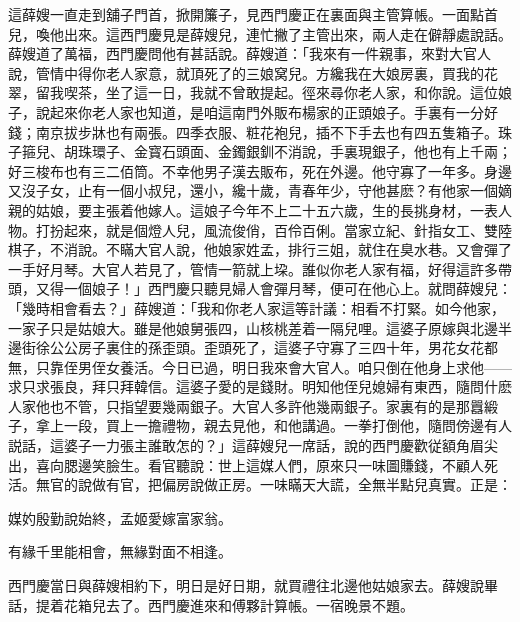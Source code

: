 這薛嫂一直走到舖子門首，掀開簾子，見西門慶正在裏面與主管算帳。一面點首兒，喚他出來。這西門慶見是薛嫂兒，連忙撇了主管出來，兩人走在僻靜處說話。薛嫂道了萬福，西門慶問他有甚話說。薛嫂道：「我來有一件親事，來對大官人說，管情中得你老人家意，就頂死了的三娘窝兒。方纔我在大娘房裏，買我的花翠，留我喫茶，坐了這一日，我就不曾敢提起。徑來尋你老人家，和你說。這位娘子，說起來你老人家也知道，是咱這南門外販布楊家的正頭娘子。手裏有一分好錢；南京拔步牀也有兩張。四季衣服、粧花袍兒，插不下手去也有四五隻箱子。珠子箍兒、胡珠環子、金寳石頭面、金鐲銀釧不消說，手裏現銀子，他也有上千兩；好三梭布也有三二佰筒。不幸他男子漢去販布，死在外邊。他守寡了一年多。身邊又沒子女，止有一個小叔兒，還小，纔十歲，青春年少，守他甚麽？有他家一個嫡親的姑娘，要主張着他嫁人。這娘子今年不上二十五六歲，生的長挑身材，一表人物。打扮起來，就是個燈人兒，風流俊俏，百伶百俐。當家立紀、針指女工、雙陸棋子，不消說。不瞞大官人說，他娘家姓孟，排行三姐，就住在臭水巷。又會彈了一手好月琴。大官人若見了，管情一箭就上垜。誰似你老人家有福，好得這許多帶頭，又得一個娘子！」西門慶只聽見婦人會彈月琴，便可在他心上。就問薛嫂兒：「幾時相會看去？」薛嫂道：「我和你老人家這等計議：相看不打緊。如今他家，一家子只是姑娘大。雖是他娘舅張四，山核桃差着一隔兒哩。這婆子原嫁與北邊半邊街徐公公房子裏住的孫歪頭。歪頭死了，這婆子守寡了三四十年，男花女花都無，只靠侄男侄女養活。今日已過，明日我來會大官人。咱只倒在他身上求他——求只求張良，拜只拜韓信。這婆子愛的是錢財。明知他侄兒媳婦有東西，隨問什麽人家他也不管，只指望要幾兩銀子。大官人多許他幾兩銀子。家裏有的是那囂緞子，拿上一段，買上一擔禮物，親去見他，和他講過。一拳打倒他，隨問傍邊有人説話，這婆子一力張主誰敢怎的？」這薛嫂兒一席話，說的西門慶歡従額角眉尖出，喜向腮邊笑臉生。看官聽說：世上這媒人們，原來只一味圖賺錢，不顧人死活。無官的說做有官，把偏房說做正房。一味瞞天大謊，全無半點兒真實。正是：

媒妁殷勤說始終，孟姬愛嫁富家翁。

有緣千里能相會，無緣對面不相逢。

西門慶當日與薛嫂相約下，明日是好日期，就買禮往北邊他姑娘家去。薛嫂說畢話，提着花箱兒去了。西門慶進來和傅夥計算帳。一宿晚景不題。

